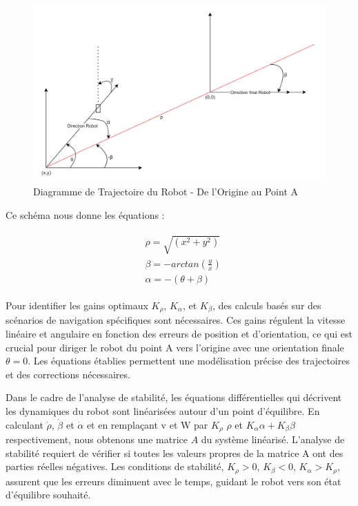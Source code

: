 \begin{figure}[!h]
    \centering
    \includegraphics[width=1.0\textwidth]{img/diagrams/2schema_transformation.png} 
    \caption{Diagramme de Trajectoire du Robot - De l'Origine au Point A}
    \label{img-abc_dq}
\end{figure}
\FloatBarrier
Ce schéma nous donne les équations : 

\begin{align*}
\begin{split}
    & \rho = \sqrt{(x^2+y^2)} \\
    & \beta = -arctan\left( \frac{y}{x} \right) \\
    & \alpha = -(\theta + \beta)
\end{split}
\end{align*}


Pour identifier les gains optimaux $K_\rho$, $K_\alpha$, et $K_\beta$, des calculs basés sur des scénarios de navigation spécifiques sont nécessaires. Ces gains régulent la vitesse linéaire et angulaire en fonction des erreurs de position et d'orientation, ce qui est crucial pour diriger le robot du point A vers l'origine avec une orientation finale $\theta = 0$. Les équations établies permettent une modélisation précise des trajectoires et des corrections nécessaires.


Dans le cadre de l'analyse de stabilité, les équations différentielles qui décrivent les dynamiques du robot sont linéarisées autour d'un point d'équilibre. En calculant $\dot{\rho}$, $\dot{\beta}$ et $\dot{\alpha}$ et en remplaçant v et W par $K_\rho$ $\rho$ et $K_\alpha \alpha + K_\beta \beta$ respectivement, nous obtenons une matrice $A$ du système linéarisé. L'analyse de stabilité requiert de vérifier si toutes les valeurs propres de la matrice A ont des parties réelles négatives. Les conditions de stabilité, $K_\rho > 0$, $K_\beta < 0$, $K_\alpha > K_\rho$, assurent que les erreurs diminuent avec le temps, guidant le robot vers son état d'équilibre souhaité.


